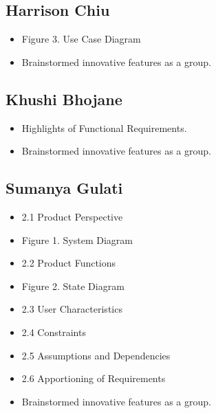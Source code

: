 \documentclass[]{article}
\begin{document}
\subsection{Harrison Chiu}
\label{subsec:harrison_chiu}
\begin{itemize}
 	\item Figure 3. Use Case Diagram
   	\item Brainstormed innovative features as a group.
 \end{itemize}

\subsection{Khushi Bhojane}
\label{subsec:khushi_bhojane}
\begin{itemize}
	\item Highlights of Functional Requirements.
 	\item Brainstormed innovative features as a group.
\end{itemize}

\subsection{Sumanya Gulati}
\label{subsec:sumanya_gulati}
\begin{itemize}
	\item 2.1 Product Perspective
 	\item Figure 1. System Diagram
  	\item 2.2 Product Functions
  	\item Figure 2. State Diagram
   	\item 2.3 User Characteristics
    	\item 2.4 Constraints
     	\item 2.5 Assumptions and Dependencies
      	\item 2.6 Apportioning of Requirements
       	\item Brainstormed innovative features as a group.
\end{itemize}
\end{document}
